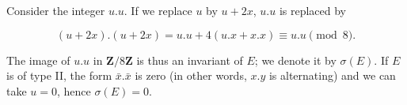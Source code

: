 Consider the integer $u.u$. If we replace $u$ by $u+2x$, $u.u$ is replaced by

$$(u+2x).(u+2x) = u.u + 4(u.x + x.x) \equiv u.u \pmod{8}.$$

The image of $u.u$ in $\mathbf{Z}/8\mathbf{Z}$ is thus an invariant of $E$; we denote it by $\sigma(E)$. If $E$ is of type II, the form $\bar{x}.\bar{x}$ is zero (in other words, $x.y$ is alternating) and we can take $u = 0$, hence $\sigma(E) = 0$.
